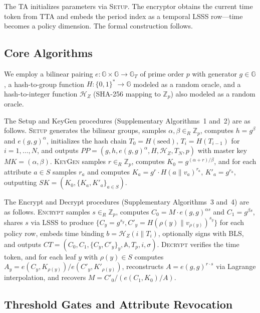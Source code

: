 \documentclass[lettersize,journal]{IEEEtran}
\begin{document}
The TA initializes parameters via \textsc{Setup}. The encryptor obtains
the current time token from TTA and embeds the period index as a temporal
LSSS row---time becomes a policy dimension. The formal construction follows.

\subsection{Core Algorithms}
\label{subsec:algorithms}

We employ a bilinear pairing $e: \mathbb{G} \times \mathbb{G}
\rightarrow \mathbb{G}_T$ of prime order $p$ with generator
$g \in \mathbb{G}$, a
hash-to-group function $H: \{0,1\}^* \rightarrow \mathbb{G}$ modeled as
a random oracle, and a hash-to-integer function $\mathcal{H}_Z$ (SHA-256
mapping to $\mathbb{Z}_p$) also modeled as a random oracle.

The Setup and KeyGen procedures (Supplementary Algorithms~1 and~2) are as
follows. \textsc{Setup} generates the bilinear groups, samples
$\alpha, \beta \in_R \mathbb{Z}_p$, computes $h=g^\beta$ and $e(g,g)^\alpha$,
initializes the hash chain $T_0 = H(\text{seed})$,
$T_i = H(T_{i-1})$ for $i=1,\ldots,N$, and outputs
$PP = (g, h, e(g,g)^\alpha, H, \mathcal{H}_Z, T_N, p)$ with master key
$MK = (\alpha, \beta)$. \textsc{KeyGen} samples $r \in_R \mathbb{Z}_p$,
computes $K_0 = g^{(\alpha+r)/\beta}$, and for each attribute $a \in S$
samples $r_a$ and computes $K_a = g^r \cdot H(a \| v_a)^{r_a}$,
$K'_a = g^{r_a}$, outputting $SK = (K_0, \{K_a, K'_a\}_{a \in S})$.

The Encrypt and Decrypt procedures (Supplementary Algorithms~3 and~4) are as
follows. \textsc{Encrypt} samples $s \in_R \mathbb{Z}_p$, computes
$C_0 = M \cdot e(g,g)^{\alpha s}$ and $C_1 = g^{\beta s}$, shares $s$ via
LSSS to produce $\{C_y = g^{s_y}, C'_y = H(\rho(y)\|v_{\rho(y)})^{s_y}\}$
for each policy row, embeds time binding $b = \mathcal{H}_Z(i\|T_i)$,
optionally signs with BLS, and outputs
$CT = (C_0, C_1, \{C_y, C'_y\}_y, \mathbb{A}, T_p, i, \sigma)$.
\textsc{Decrypt} verifies the time token, and for each leaf $y$ with
$\rho(y) \in S$ computes $A_y = e(C_y, K_{\rho(y)}) / e(C'_y, K'_{\rho(y)})$,
reconstructs $A = e(g,g)^{r \cdot s}$ via Lagrange interpolation, and
recovers $M = C'_0 / (e(C_1, K_0) / A)$.

\subsection{Threshold Gates and Attribute Revocation}
\label{subsec:threshold_revocation}
\end{document}
